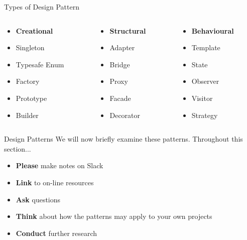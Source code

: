 \begin{frame}{Types of Design Pattern}
	\begin{columns}[onlytextwidth]
		\begin{column}{0.33\textwidth}
			\begin{itemize}
				\item \textbf{Creational}
				\item Singleton
				\item Typesafe Enum
				\item Factory
				\item Prototype
				\item Builder
			\end{itemize}
		\end{column}
		\begin{column}{0.33\textwidth}
			\begin{itemize}
				\item \textbf{Structural}
				\item Adapter
				\item Bridge
				\item Proxy
				\item Facade
				\item Decorator
			\end{itemize}
		\end{column}
		\begin{column}{0.33\textwidth}
			\begin{itemize}
				\item \textbf{Behavioural}
				\item Template
				\item State
				\item Observer
				\item Visitor				
				\item Strategy
			\end{itemize}
		\end{column}
	\end{columns}
\end{frame}

\begin{frame}{Design Patterns}
	We will now briefly examine these patterns. Throughout this section...
	
	\begin{itemize}
		\item \textbf{Please} make notes on Slack
		\item \textbf{Link} to on-line resources
		\item \textbf{Ask} questions
		\item \textbf{Think} about how the patterns may apply to your own projects
		\item \textbf{Conduct} further research
	\end{itemize}
\end{frame}

